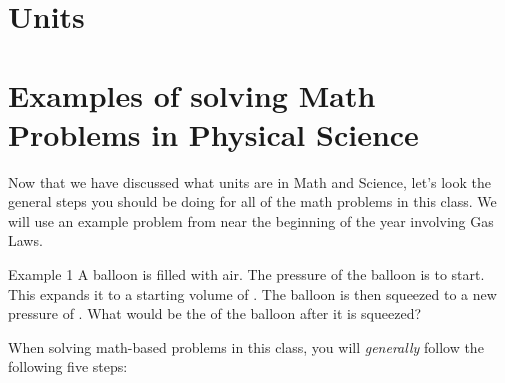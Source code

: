 \documentclass[../../main.tex]{subfiles}
\begin{document}
\begin{figure}[!ht]
	\centering
	\label{fig:my_label}
\end{figure}

\section{Units}

\section{Examples of solving Math Problems in Physical Science}

Now that we have discussed what units are in Math and Science, let's look the general steps you should be doing for all of the math problems in this class.  We will use an example problem from near the beginning of the year involving Gas Laws.

\begin{boxGray}{Example 1}
	A balloon is filled with air.  The pressure of the balloon is  to start.  This expands it to a starting volume of .  The balloon is then squeezed to a new pressure of .  What would be the  of the balloon after it is squeezed?
\end{boxGray}

When solving math-based problems in this class, you will \emph{generally} follow the following five steps:
\end{document}
